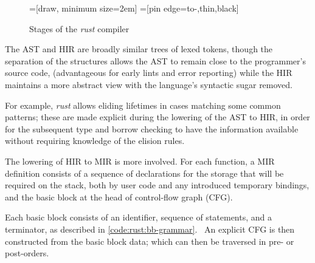 \begin{figure}[!ht]
    \centering
    =[draw, minimum size=2em]
    =[pin edge={to-,thin,black}]
    \caption{Stages of the \emph{rust} compiler}
    \label{fig:rust:compiler-stages}
\end{figure}

The AST and HIR are broadly similar trees of lexed tokens, though the separation of the structures allows the AST to remain close to the programmer's source code, (advantageous for early lints and error reporting) while the HIR maintains a more abstract view with the language's syntactic sugar removed.

For example, \emph{rust} allows eliding lifetimes in cases matching some common patterns; these are made explicit during the lowering of the AST to HIR, in order for the subsequent type and borrow checking to have the information available without requiring knowledge of the elision rules. \cite{rust_rfc1191}

The lowering of HIR to MIR is more involved. For each function, a MIR definition consists of a sequence of declarations for the storage that will be required on the stack, both by user code and any introduced temporary bindings, and the basic block at the head of control-flow graph (CFG).

Each basic block consists of an identifier, sequence of statements, and a terminator, as described in \cref{code:rust:bb-grammar}.~\cite{rust_rfc1211} An explicit CFG is then constructed from the basic block data; which can then be traversed in pre- or post-orders.

